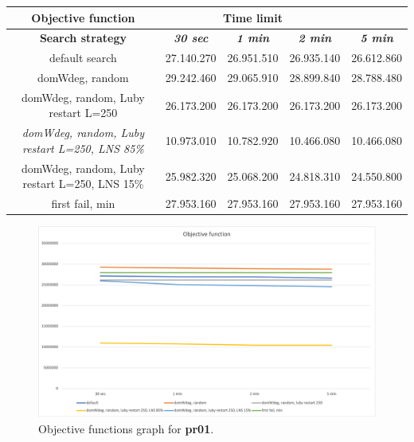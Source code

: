 {
\renewcommand{\arraystretch}{2}
\begin{longtable}[h]{| c | c | c | c | c |}
    \hline
    \textbf{Objective function} & \multicolumn{3}{c}{Time limit} & \\
    \hline
    \textbf{Search strategy} & \textbf{\textit{30 sec}} & \textbf{\textit{1 min}} & \textbf{\textit{2 min}} & \textbf{\textit{5 min}} \\
    \hline
    \endhead
    default search                                         & 27.140.270 & 26.951.510 & 26.935.140 & 26.612.860 \\
    \hline
    domWdeg, random                                        & 29.242.460 & 29.065.910 & 28.899.840 & 28.788.480 \\
    \hline
    domWdeg, random, Luby restart L=250                    & 26.173.200 & 26.173.200 & 26.173.200 & 26.173.200 \\
    \hline
    \textit{domWdeg, random, Luby restart L=250, LNS 85\%} & 10.973.010 & 10.782.920 & 10.466.080 & 10.466.080 \\
    \hline
    domWdeg, random, Luby restart L=250, LNS 15\%          & 25.982.320 & 25.068.200 & 24.818.310 & 24.550.800 \\
    \hline
    first fail, min                                        & 27.953.160 & 27.953.160 & 27.953.160 & 27.953.160 \\
    \hline
\end{longtable}
}
\begin{figure}[H]
    \centering
    \includegraphics[width=0.8\columnwidth]{../graphs/pr01-objf.png}
    \caption{Objective functions graph for \textbf{pr01}.}
\end{figure}

